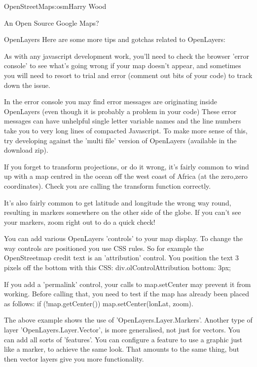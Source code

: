\begin{aosachapter}{OpenStreetMap}{s:osm}{Harry Wood}
\begin{aosasect1}{An Open Source Google Maps?}
\begin{aosasect2}{OpenLayers}
Here are some more tips and gotchas related to OpenLayers:

\begin{aosaitemize}

\item As with any javascript development work, you'll need to check
  the browser 'error console' to see what's going wrong if your map
  doesn't appear, and sometimes you will need to resort to trial and
  error (comment out bits of your code) to track down the issue.

\item In the error console you may find error messages are originating
  inside OpenLayers (even though it is probably a problem in your
  code) These error messages can have unhelpful single letter variable
  names and the line numbers take you to very long lines of compacted
  Javascript. To make more sense of this, try developing against the
  'multi file' version of OpenLayers (available in the download zip).

\item If you forget to transform projections, or do it wrong, it's
  fairly common to wind up with a map centred in the ocean off the
  west coast of Africa (at the zero,zero coordinates). Check you are
  calling the transform function correctly.

\item It's also fairly common to get latitude and longitude the wrong
  way round, resulting in markers somewhere on the other side of the
  globe. If you can't see your markers, zoom right out to do a quick
  check!

\item You can add various OpenLayers 'controls' to your map
  display. To change the way controls are positioned you use CSS
  rules. So for example the OpenStreetmap credit text is an
  'attribution' control. You position the text 3 pixels off the bottom
  with this CSS: div.olControlAttribution {bottom: 3px;}

\item If you add a 'permalink' control, your calls to map.setCenter
  may prevent it from working. Before calling that, you need to test
  if the map has already been placed as follows: if (!map.getCenter())
  map.setCenter(lonLat, zoom).

\item The above example shows the use of
  'OpenLayers.Layer.Markers'. Another type of layer
  'OpenLayers.Layer.Vector', is more generalised, not just for
  vectors. You can add all sorts of 'features'. You can configure a
  feature to use a graphic just like a marker, to achieve the same
  look. That amounts to the same thing, but then vector layers give
  you more functionality.


\end{aosaitemize}
\end{aosasect2}
\end{aosasect1}
\end{aosachapter}

